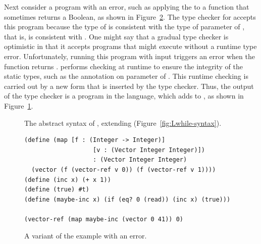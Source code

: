\documentclass[7x10,nocrop]{TimesAPriori_MIT}%
\newcommand{\gray}[1]{{\color{gray} #1}}
\begin{document}
Next consider a program with an error, such as applying the
 to a function that sometimes returns a Boolean, as
shown in Figure~\ref{fig:map-maybe-inc}.  The type checker for
\LangGrad{} accepts this program because the type of  is
consistent with the type of parameter  of , that
is,  is consistent with . One might say that a gradual type checker is optimistic
in that it accepts programs that might execute without a runtime type
error.
%
Unfortunately, running this program with input  triggers an
error when the  function returns . \LangGrad{}
performs checking at runtime to ensure the integrity of the static
types, such as the  annotation on parameter
 of .  This runtime checking is carried out by a
new  form that is inserted by the type checker.  Thus, the
output of the type checker is a program in the \LangCast{} language, which
adds  to \LangLoop{}, as shown in
Figure~\ref{fig:Rgrad-prime-syntax}.

\begin{figure}[tp]
\centering
\fbox{
\begin{minipage}{0.96\textwidth}
\small
\[
\begin{array}{lcl}
  \Exp &::=& \ldots \MID \CAST{\Exp}{\Type}{\Type} \\
  \LangCastM{} &::=& \gray{ \PROGRAMDEFSEXP{\code{'()}}{\LP\Def\ldots\RP}{\Exp} }
\end{array}
\]
\end{minipage}
}
\caption{The abstract syntax of \LangCast{}, extending \LangLoop{} (Figure~\ref{fig:Lwhile-syntax}).}
\label{fig:Rgrad-prime-syntax}
\end{figure}


\begin{figure}[tbp]
\begin{lstlisting}
(define (map [f : (Integer -> Integer)]
                   [v : (Vector Integer Integer)])
                   : (Vector Integer Integer)
  (vector (f (vector-ref v 0)) (f (vector-ref v 1))))
(define (inc x) (+ x 1))
(define (true) #t)
(define (maybe-inc x) (if (eq? 0 (read)) (inc x) (true)))

(vector-ref (map maybe-inc (vector 0 41)) 0)
\end{lstlisting}
\caption{A variant of the  example with an error.}
\label{fig:map-maybe-inc}
\end{figure}
\end{document}

